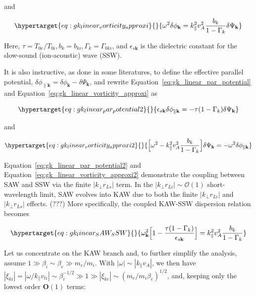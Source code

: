 \documentclass[
  notoc %
]{tufte-book}
\begin{document}
and

\begin{equation}\protect\hypertarget{eq:gk_linear_vorticity_approxi}{}{
\omega^2 \delta\phi_\mathbf{k} = k_\parallel^2 v_A^2 \frac{b_k}{1-\Gamma_k}\delta\Psi_\mathbf{k}
}\label{eq:gk_linear_vorticity_approxi}\end{equation}

Here, \(\tau=T_{0e}/T_{0i}, b_k=b_{ki}, \Gamma_k=\Gamma_{0ki}\), and
\(\epsilon_{s\mathbf{k}}\) is the dielectric constant for the slow-sound
(ion-acoustic) wave (SSW).

It is also instructive, as done in some literatures, to define the
effective parallel potential,
\(\delta\phi_{\parallel\mathbf{k}}=\delta\phi_\mathbf{k} - \delta\Psi_\mathbf{k}\),
and rewrite Equation~\ref{eq:gk_linear_par_potential} and
Equation~\ref{eq:gk_linear_vorticity_approxi} as

\begin{equation}\protect\hypertarget{eq:gk_linear_par_potential2}{}{
\epsilon_{s\mathbf{k}} \delta\phi_{\parallel\mathbf{k}} = -\tau(1-\Gamma_k)\delta\Psi_\mathbf{k}
}\label{eq:gk_linear_par_potential2}\end{equation}

and

\begin{equation}\protect\hypertarget{eq:gk_linear_vorticity_approxi2}{}{
\Big[ \omega^2 - k_\parallel^2v_A^2\frac{b_k}{1-\Gamma_k} \Big] \delta\Psi_\mathbf{k} = -\omega^2\delta\phi_{\parallel\mathbf{k}}
}\label{eq:gk_linear_vorticity_approxi2}\end{equation}

Equation~\ref{eq:gk_linear_par_potential2} and
Equation~\ref{eq:gk_linear_vorticity_approxi2} demonstrate the coupling
between SAW and SSW via the finite \(|k_\perp r_{Ls}|\) term. In the
\(|k_\perp r_{Li}|\sim\mathcal{O}(1)\) short-wavelength limit, SAW
evolves into KAW due to both the finite \(|k_\perp r_{Li}|\) and
\(|k_\perp r_{Ls}|\) effects. (???) More specifically, the coupled
KAW-SSW dispersion relation becomes

\begin{equation}\protect\hypertarget{eq:gk_linear_SAW_SSW}{}{
\omega_\mathbf{k}^2\Big[ 1-\frac{\tau(1-\Gamma_k)}{\epsilon_{s\mathbf{k}}} \Big] = k_\parallel^2 v_A^2 \frac{b_k}{1-\Gamma_k}
}\label{eq:gk_linear_SAW_SSW}\end{equation}

Let us concentrate on the KAW branch and, to further simplify the
analysis, assume \(1\gg \beta_i\sim\beta_e\gg m_e/m_i\). With
\(|\omega|\sim|k_\parallel v_A|\), we then have
\(|\xi_{ki}|=|\omega/k_\parallel v_{ti}|\sim\beta_i^{-1/2}\gg 1 \gg |\xi_{ke}|\sim(m_e/m_i\beta_e)^{1/2}\),
and, keeping only the lowest order \(\mathbf{O}(1)\) terms:
\end{document}
